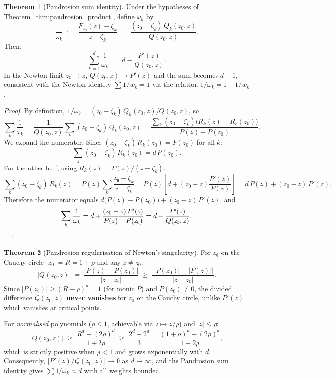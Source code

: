 \documentclass[11pt,a4paper]{article}
\theoremstyle{definition}
\newtheorem{theorem}{Theorem}[section]
\begin{document}
\begin{theorem}[Pandrosion sum identity]
\label{thm:pandrosion_sum}
Under the hypotheses of Theorem~\ref{thm:pandrosion_product}, define $\omega_k$ by
\[
  \frac{1}{\omega_k} \;:=\; \frac{F_{z_0}(z) - \zeta_k}{z - \zeta_k}
  \;=\; \frac{(z_0 - \zeta_k)\,Q_k(z_0,z)}{Q(z_0,z)}.
\]
Then:
\begin{equation}
  \label{eq:pandrosion_sum}
  \sum_{k=1}^d \frac{1}{\omega_k}
  \;=\; d - \frac{P'(z)}{Q(z_0,z)}.
\end{equation}
In the Newton limit $z_0 \to z$, $Q(z_0,z) \to P'(z)$ and the sum becomes $d - 1$, consistent with the Newton identity $\sum 1/w_k = 1$ via the relation $1/\omega_k = 1 - 1/w_k$.
\end{theorem}

\begin{proof}
By definition, $1/\omega_k = (z_0-\zeta_k)\,Q_k(z_0,z)/Q(z_0,z)$, so
\[
  \sum_k \frac{1}{\omega_k}
  = \frac{1}{Q(z_0,z)} \sum_k (z_0-\zeta_k)\,Q_k(z_0,z)
  = \frac{\sum_k (z_0-\zeta_k)\bigl(R_k(z)-R_k(z_0)\bigr)}{P(z)-P(z_0)}.
\]
We expand the numerator.  Since $(z_0-\zeta_k)\,R_k(z_0) = P(z_0)$ for all $k$:
\[
  \sum_k (z_0-\zeta_k)\,R_k(z_0) = d\,P(z_0).
\]
For the other half, using $R_k(z) = P(z)/(z-\zeta_k)$:
\[
  \sum_k (z_0-\zeta_k)\,R_k(z) = P(z)\sum_k \frac{z_0-\zeta_k}{z-\zeta_k}
  = P(z)\left[d + (z_0-z)\frac{P'(z)}{P(z)}\right]
  = d\,P(z) + (z_0-z)\,P'(z).
\]
Therefore the numerator equals $d\bigl(P(z)-P(z_0)\bigr) + (z_0-z)\,P'(z)$, and
\[
  \sum_k \frac{1}{\omega_k}
  = d + \frac{(z_0-z)\,P'(z)}{P(z)-P(z_0)}
  = d - \frac{P'(z)}{Q(z_0,z)}.
  \qedhere
\]
\end{proof}

\begin{theorem}[Pandrosion regularisation of Newton's singularity]
\label{thm:pandrosion_regularisation}
For $z_0$ on the Cauchy circle $|z_0| = R = 1 + \rho$ and any $z \neq z_0$:
\[
  |Q(z_0, z)| \;=\; \frac{|P(z) - P(z_0)|}{|z - z_0|}
  \;\geq\; \frac{\bigl||P(z_0)| - |P(z)|\bigr|}{|z - z_0|}.
\]
Since $|P(z_0)| \geq (R-\rho)^d = 1$ (for monic $P$) and $P(z_0) \neq 0$, the divided difference $Q(z_0,z)$ \textbf{never vanishes} for $z_0$ on the Cauchy circle, unlike $P'(z)$ which vanishes at critical points.

For \emph{normalised} polynomials ($\rho \leq 1$, achievable via $z \mapsto z/\rho$) and $|z| \leq \rho$:
\[
  |Q(z_0, z)| \;\geq\; \frac{R^d - (2\rho)^d}{1+2\rho} \;\geq\; \frac{2^d - 2^d}{3} = \frac{(1+\rho)^d - (2\rho)^d}{1+2\rho},
\]
which is strictly positive when $\rho < 1$ and grows exponentially with $d$.  Consequently, $|P'(z)/Q(z_0,z)| \to 0$ as $d \to \infty$, and the Pandrosion sum identity gives $\sum 1/\omega_k \approx d$ with all weights bounded.
\end{theorem}
\end{document}
